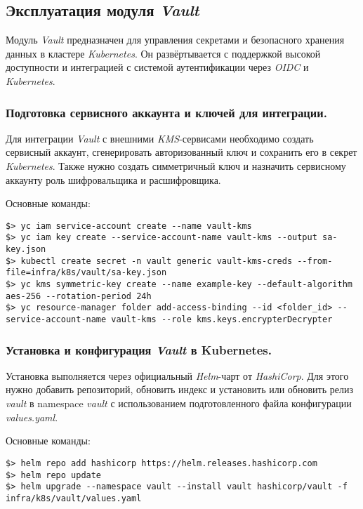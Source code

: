 \subsection{Эксплуатация модуля \textit{Vault}}

Модуль \textit{Vault} предназначен для управления секретами и безопасного хранения данных в кластере \textit{Kubernetes}. Он развёртывается с поддержкой высокой доступности и интеграцией с системой аутентификации через \textit{OIDC} и \textit{Kubernetes}.

\subsubsection{Подготовка сервисного аккаунта и ключей для интеграции.} Для интеграции \textit{Vault} с внешними \textit{KMS}-сервисами необходимо создать сервисный аккаунт, сгенерировать авторизованный ключ и сохранить его в секрет \textit{Kubernetes}. Также нужно создать симметричный ключ и назначить сервисному аккаунту роль шифровальщика и расшифровщика.

Основные команды:

\begin{lstlisting}
$> yc iam service-account create --name vault-kms
$> yc iam key create --service-account-name vault-kms --output sa-key.json
$> kubectl create secret -n vault generic vault-kms-creds --from-file=infra/k8s/vault/sa-key.json
$> yc kms symmetric-key create --name example-key --default-algorithm aes-256 --rotation-period 24h
$> yc resource-manager folder add-access-binding --id <folder_id> --service-account-name vault-kms --role kms.keys.encrypterDecrypter
\end{lstlisting}

\subsubsection{Установка и конфигурация \textit{Vault} в Kubernetes.} Установка выполняется через официальный \textit{Helm}-чарт от \textit{HashiCorp}. Для этого нужно добавить репозиторий, обновить индекс и установить или обновить релиз \textit{vault} в namespace \textit{vault} с использованием подготовленного файла конфигурации \textit{values.yaml}.

Основные команды:

\begin{lstlisting}
$> helm repo add hashicorp https://helm.releases.hashicorp.com
$> helm repo update
$> helm upgrade --namespace vault --install vault hashicorp/vault -f infra/k8s/vault/values.yaml
\end{lstlisting}

